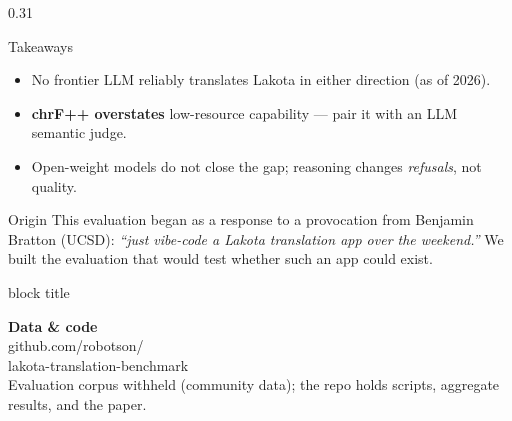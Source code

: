 \documentclass[final]{beamer}
\begin{document}
\begin{frame}[t]
\begin{columns}[t]
\begin{column}{0.31\paperwidth}
\begin{block}{Takeaways}
\begin{itemize}
\item No frontier LLM reliably translates Lakota in either direction (as of 2026).
\item \textbf{chrF++ overstates} low-resource capability --- pair it with an LLM semantic judge.
\item Open-weight models do not close the gap; reasoning changes \emph{refusals}, not quality.
\end{itemize}
\end{block}

\begin{block}{Origin}
{\small This evaluation began as a response to a provocation from Benjamin Bratton (UCSD): \emph{``just vibe-code a Lakota translation app over the weekend.''} We built the evaluation that would test whether such an app could exist.}
\end{block}

\vspace{6pt}
\begin{beamercolorbox}[wd=0.31\paperwidth,sep=14pt]{block title}
\centering
\begin{minipage}{0.32\linewidth}\centering{}\end{minipage}\hfill
\begin{minipage}{0.62\linewidth}\raggedright
{\headfont\bfseries Data \& code}\\[2pt]
{\small github.com/robotson/\\lakota-translation-benchmark}\\[4pt]
{\footnotesize Evaluation corpus withheld (community data); the repo holds scripts, aggregate results, and the paper.}
\end{minipage}
\end{beamercolorbox}

\end{column}
\end{columns}

\end{frame}
\end{document}
